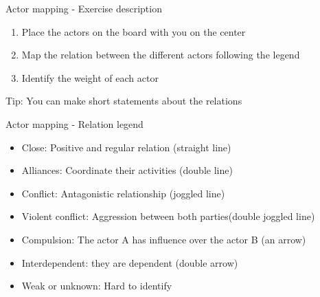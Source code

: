 \documentclass[11pt]{beamer}
\begin{document}
\begin{frame}{Actor mapping - Exercise description}
\begin{enumerate}
\item Place the actors on the board with you on the center
\item Map the relation between the different actors following the legend
\item Identify the weight of each actor
\end{enumerate}
Tip: You can make short statements about the relations
\end{frame}
\begin{frame}{Actor mapping - Relation legend}
\begin{itemize}
\item Close: Positive and regular relation (straight line)
\item Alliances: Coordinate their activities (double line)
\item Conflict: Antagonistic relationship (joggled  line)
\item Violent conflict: Aggression between both parties(double joggled line)
\item Compulsion: The actor A has influence over the actor B (an arrow)
\item Interdependent: they are dependent  (double arrow)
\item Weak or unknown: Hard to identify
\end{itemize}
\end{frame}
\end{document}
